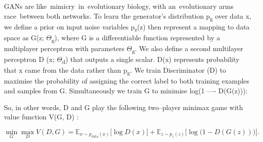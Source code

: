 \documentclass[12pt,a4paper]{report}
\numberwithin{equation}{section}
\begin{document}
GANs are like~mimicry~in~evolutionary biology, with an~evolutionary arms
race~between both networks. To learn the generator's distribution
p\textsubscript{g} over data x, we define a prior on input noise
variables p\textsubscript{z}(z) then represent a mapping to data space
as G(z; $\Theta$\textsubscript{g}), where G is a differentiable function
represented by a multiplayer perceptron with parameters
$\Theta$\textsubscript{g}. We also define a second multilayer perceptron D (x;
$\Theta$\textsubscript{d}) that outputs a single scalar. D(x) represents
probability that x came from the data rather than p\textsubscript{g}. We
train Discriminator (D) to maximise the probability of assigning the
correct label to both training examples and samples from G.
Simultaneously we train G to minimise log(1 ---- D(G(z))):

So, in other words, D and G play the following two--player minimax game
with value function V(G, D) \cite{goodfellow2014generative_61}:

\begin{equation}\label{eq:2.1.35}
\min_{G}\max_{D} V(D,G)
= \mathbb{E}_{x\sim p_{\text{data}}(x)}\!\big[\log D(x)\big]
+ \mathbb{E}_{z\sim p_{z}(z)}\!\big[\log\!\big(1 - D(G(z))\big)\big].
\end{equation}
\end{document}
